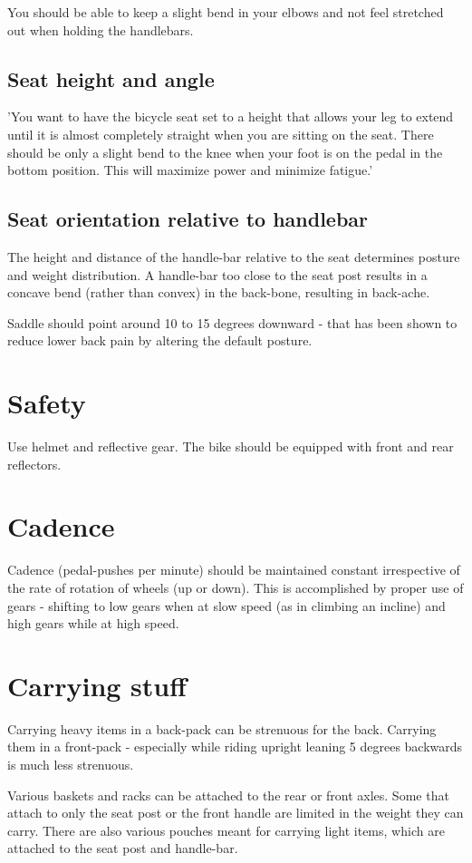 \documentclass[oneside, article]{memoir}
\begin{document}
You should be able to keep a slight bend in your elbows and not feel stretched out when holding the handlebars.

\subsection{Seat height and angle}
'You want to have the bicycle seat set to a height that allows your leg to extend until it is almost completely straight when you are sitting on the seat. There should be only a slight bend to the knee when your foot is on the pedal in the bottom position. This will maximize power and minimize fatigue.'

\subsection{Seat orientation relative to handlebar}
The height and distance of the handle-bar relative to the seat determines posture and weight distribution. A handle-bar too close to the seat post results in a concave bend (rather than convex) in the back-bone, resulting in back-ache.

Saddle should point around 10 to 15 degrees downward - that has been shown to reduce lower back pain by altering the default posture.

\section{Safety}
Use helmet and reflective gear. The bike should be equipped with front and rear reflectors.

\section{Cadence}
Cadence (pedal-pushes per minute) should be maintained constant irrespective of the rate of rotation of wheels (up or down). This is accomplished by proper use of gears - shifting to low gears when at slow speed (as in climbing an incline) and high gears while at high speed.

\section{Carrying stuff}
Carrying heavy items in a back-pack can be strenuous for the back. Carrying them in a front-pack - especially while riding upright leaning 5 degrees backwards is much less strenuous.

Various baskets and racks can be attached to the rear or front axles. Some that attach to only the seat post or the front handle are limited in the weight they can carry. There are also various pouches meant for carrying light items, which are attached to the seat post and handle-bar.
\end{document}
